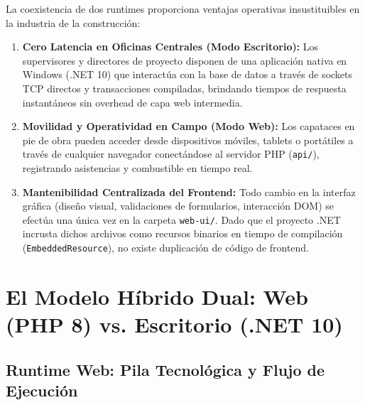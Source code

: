 \documentclass[11pt,a4paper,openany]{report}
\begin{document}
La coexistencia de dos runtimes proporciona ventajas operativas insustituibles en la industria de la construcción:
\begin{enumerate}
    \item \textbf{Cero Latencia en Oficinas Centrales (Modo Escritorio):} Los supervisores y directores de proyecto disponen de una aplicación nativa en Windows (.NET 10) que interactúa con la base de datos a través de sockets TCP directos y transacciones compiladas, brindando tiempos de respuesta instantáneos sin overhead de capa web intermedia.
    \item \textbf{Movilidad y Operatividad en Campo (Modo Web):} Los capataces en pie de obra pueden acceder desde dispositivos móviles, tablets o portátiles a través de cualquier navegador conectándose al servidor PHP (\texttt{api/}), registrando asistencias y combustible en tiempo real.
    \item \textbf{Mantenibilidad Centralizada del Frontend:} Todo cambio en la interfaz gráfica (diseño visual, validaciones de formularios, interacción DOM) se efectúa una única vez en la carpeta \texttt{web-ui/}. Dado que el proyecto .NET incrusta dichos archivos como recursos binarios en tiempo de compilación (\texttt{EmbeddedResource}), no existe duplicación de código de frontend.
\end{enumerate}

\chapter{El Modelo Híbrido Dual: Web (PHP 8) vs. Escritorio (.NET 10)}

\section{Runtime Web: Pila Tecnológica y Flujo de Ejecución}
\end{document}
